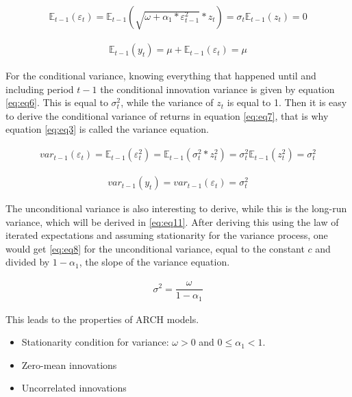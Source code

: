 \documentclass[a4paper, twoside]{templates/ociamthesis}
\begin{document}
\begin{align} 
\mathbb{E}_{t-1}(\varepsilon_{t}) = \mathbb{E}_{t-1}(\sqrt{\omega + \alpha_1 *  \varepsilon_{t-1}^2} * z_t) = \sigma_t\mathbb{E}_{t-1}(z_t) = 0
 \label{eq:eq4}
\end{align} 

\begin{align} 
\mathbb{E}_{t-1}(y_{t}) = \mu + \mathbb{E}_{t-1}(\varepsilon_{t}) = \mu
 \label{eq:eq5}
\end{align}

For the conditional variance, knowing everything that happened until and including period \(t-1\) the conditional innovation variance is given by equation \eqref{eq:eq6}. This is equal to \(\sigma_t^2\), while the variance of \(z_t\) is equal to 1. Then it is easy to derive the conditional variance of returns in equation \eqref{eq:eq7}, that is why equation \eqref{eq:eq3} is called the variance equation.

\begin{align} 
var_{t-1}(\varepsilon_t) = \mathbb{E}_{t-1}(\varepsilon_{t}^2) = \mathbb{E}_{t-1}(\sigma_t^2 * z_t^2) = \sigma_t^2\mathbb{E}_{t-1}(z_t^2) = \sigma_t^2
 \label{eq:eq6}
\end{align} 

\begin{align} 
var_{t-1}(y_t) = var_{t-1}(\varepsilon_t)= \sigma_t^2
 \label{eq:eq7}
\end{align}

The unconditional variance is also interesting to derive, while this is the long-run variance, which will be derived in \eqref{eq:eq11}. After deriving this using the law of iterated expectations and assuming stationarity for the variance process, one would get \eqref{eq:eq8} for the unconditional variance, equal to the constant \(c\) and divided by \(1-\alpha_1\), the slope of the variance equation.

\begin{align} 
\sigma^2 = \dfrac{\omega}{1-\alpha_1}
 \label{eq:eq8}
\end{align}

This leads to the properties of ARCH models.

\begin{itemize}
\item
  Stationarity condition for variance: \(\omega>0\) and \(0 \le \alpha_1 < 1\).
\item
  Zero-mean innovations
\item
  Uncorrelated innovations
\end{itemize}
\end{document}
